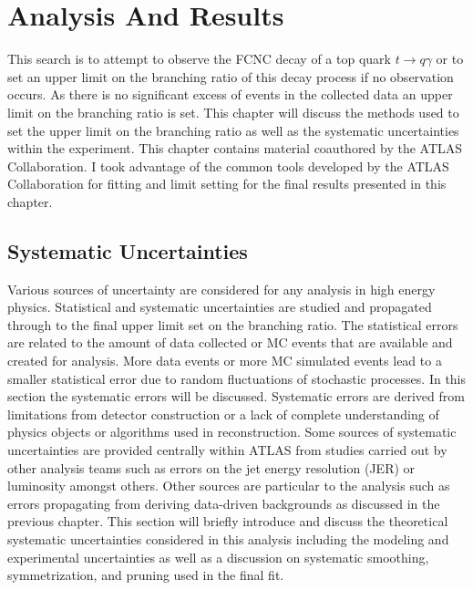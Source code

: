
\chapter{Analysis And Results}
\label{ch:Results}
This search is to attempt to observe the FCNC decay of a top quark $t \rightarrow q \gamma$ or to set an upper limit on the branching ratio of this decay process if no observation occurs.  As there is no significant excess of events in the collected data an upper limit on the branching ratio is set.  This chapter will discuss  the methods used to set the upper limit on the branching ratio as well as the systematic uncertainties within the experiment.   This chapter contains material coauthored by the ATLAS Collaboration.  I took advantage of the common tools developed by the ATLAS Collaboration for fitting and limit setting for the final results presented in this chapter.

\section{Systematic Uncertainties}
\label{sec:NPUncertainties}
Various sources of uncertainty are considered for any analysis in high energy physics.  Statistical and systematic uncertainties are studied and propagated through to the final upper limit set on the branching ratio.  The statistical errors are related to the amount of data collected or MC events that are available and created for analysis.  More data events or more MC simulated events lead to a smaller statistical error due to random fluctuations of stochastic processes.  In this section the systematic errors will be discussed.  Systematic errors are derived from limitations from detector construction or a lack of complete understanding of physics objects or algorithms used in reconstruction.  Some sources of systematic uncertainties are provided centrally within ATLAS from studies carried out by other analysis teams such as errors on the jet energy resolution (JER) or luminosity amongst others. Other sources are particular to the analysis such as errors propagating from deriving data-driven backgrounds as discussed in the previous chapter.
This section will briefly introduce and discuss the theoretical systematic uncertainties considered in this analysis including the modeling and experimental uncertainties as well as a discussion on systematic smoothing, symmetrization, and pruning used in the final fit. 

